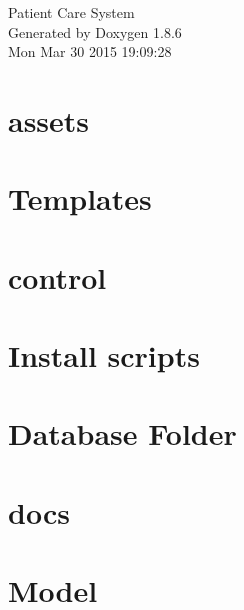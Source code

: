 \documentclass[twoside]{book}
\newcommand{\clearemptydoublepage}{%
  \newpage{\pagestyle{empty}\cleardoublepage}%
}
\begin{document}
\hypersetup{pageanchor=false}
\begin{titlepage}
\vspace*{7cm}
\begin{center}%
{\Large Patient Care System }\\
\vspace*{1cm}
{\large Generated by Doxygen 1.8.6}\\
\vspace*{0.5cm}
{\small Mon Mar 30 2015 19:09:28}\\
\end{center}
\end{titlepage}
\clearemptydoublepage
\tableofcontents
\clearemptydoublepage
{}
\hypersetup{pageanchor=true}

\chapter{assets}
\label{md_assets_readme}
\hypertarget{md_assets_readme}{}

\chapter{Templates}
\label{md_assets_template_readme}
\hypertarget{md_assets_template_readme}{}

\chapter{control}
\label{md_control_readme}
\hypertarget{md_control_readme}{}

\chapter{Install scripts}
\label{md_db_db_install_scripts_readme}
\hypertarget{md_db_db_install_scripts_readme}{}

\chapter{Database Folder}
\label{md_db_readme}
\hypertarget{md_db_readme}{}

\chapter{docs}
\label{md_docs_readme}
\hypertarget{md_docs_readme}{}

\chapter{Model}
\label{md_model_readme}
\hypertarget{md_model_readme}{}

\end{document}
